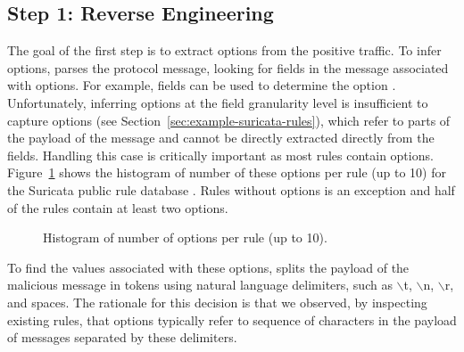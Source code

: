 \documentclass[runningheads]{llncs}
\begin{document}
\subsection{Step 1: Reverse Engineering}
\pgfplotsset{width=6cm,compat=1.8}


The goal of the first step is to extract options from the positive
traffic. To infer options, \tname{} parses the protocol message, looking for
fields in the message associated with options. For example, fields
  can be used to determine the option
. Unfortunately, inferring options at the field granularity
level is insufficient to capture  options (see
Section~\ref{sec:example-suricata-rules}), which refer to parts of the
payload of the message and cannot be directly extracted directly from
the fields. Handling this case is critically important as most rules
contain  options. Figure~\ref{fig:distribution-contents} shows
the histogram of number of these options per rule (up to 10) for the
Suricata public rule database . Rules without 
options is an exception and half of the rules contain at least two
 options.
\begin{figure}
  \centering
  \vspace{-3ex}
  \caption{\label{fig:distribution-contents}Histogram of number of
     options per rule (up to 10).}
\end{figure}
To find the values associated with these options, \tname{} splits the
payload of the malicious message in tokens using natural language
delimiters, such as $\backslash$t, $\backslash$n, $\backslash$r, and
spaces. The rationale for this decision is that we observed, by
inspecting existing rules, that  options typically refer to
sequence of characters in the payload of messages separated by these
delimiters. 
\end{document}
